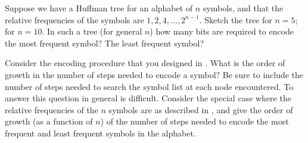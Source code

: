 \begin{exercise}
	\label{Exercise 2.71}
	Suppose we have a Huffman tree for an alphabet of \( n \) symbols, and that the relative frequencies of the symbols are \( 1, 2, 4, \dotsc, 2^{n-1} \).
	Sketch the tree for \( n = 5 \);
	for \( n = 10 \).
	In such a tree (for general \( n \)) how many bits are required to encode the most frequent symbol?
	The least frequent symbol?
\end{exercise}



\begin{exercise}
	\label{Exercise 2.72}
	Consider the encoding procedure that you designed in .
	What is the order of growth in the number of steps needed to encode a symbol?
	Be sure to include the number of steps needed to search the symbol list at each node encountered.
	To answer this question in general is difficult.
	Consider the special case where the relative frequencies of the \( n \) symbols are as described in , and give the order of growth (as a function of \( n \)) of the number of steps needed to encode the most frequent and least frequent symbols in the alphabet.
\end{exercise}
